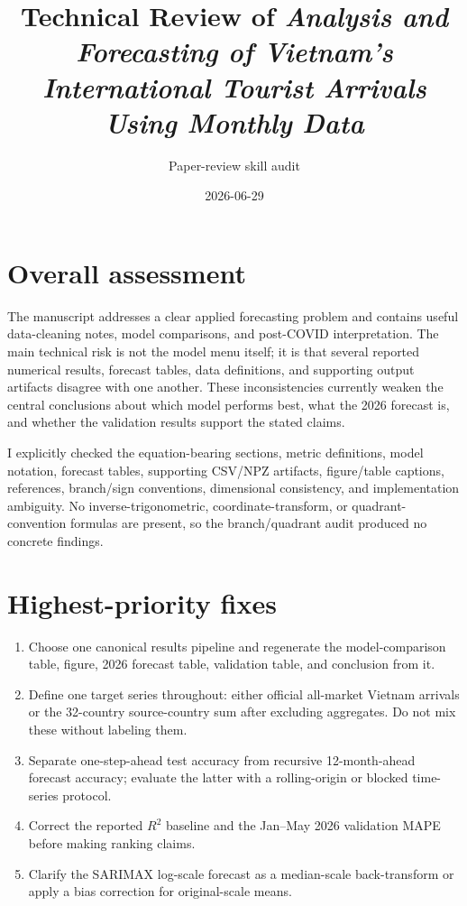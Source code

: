 \documentclass[11pt]{article}
\title{Technical Review of \emph{Analysis and Forecasting of Vietnam's International Tourist Arrivals Using Monthly Data}}
\author{Paper-review skill audit}
\date{2026-06-29}
\begin{document}
\maketitle

\section*{Overall assessment}

The manuscript addresses a clear applied forecasting problem and contains useful data-cleaning notes, model comparisons, and post-COVID interpretation. The main technical risk is not the model menu itself; it is that several reported numerical results, forecast tables, data definitions, and supporting output artifacts disagree with one another. These inconsistencies currently weaken the central conclusions about which model performs best, what the 2026 forecast is, and whether the validation results support the stated claims.

I explicitly checked the equation-bearing sections, metric definitions, model notation, forecast tables, supporting CSV/NPZ artifacts, figure/table captions, references, branch/sign conventions, dimensional consistency, and implementation ambiguity. No inverse-trigonometric, coordinate-transform, or quadrant-convention formulas are present, so the branch/quadrant audit produced no concrete findings.

\section*{Highest-priority fixes}

\begin{enumerate}
\item Choose one canonical results pipeline and regenerate the model-comparison table, figure, 2026 forecast table, validation table, and conclusion from it.
\item Define one target series throughout: either official all-market Vietnam arrivals or the 32-country source-country sum after excluding aggregates. Do not mix these without labeling them.
\item Separate one-step-ahead test accuracy from recursive 12-month-ahead forecast accuracy; evaluate the latter with a rolling-origin or blocked time-series protocol.
\item Correct the reported \(R^2\) baseline and the Jan--May 2026 validation MAPE before making ranking claims.
\item Clarify the SARIMAX log-scale forecast as a median-scale back-transform or apply a bias correction for original-scale means.
\end{enumerate}
\end{document}
